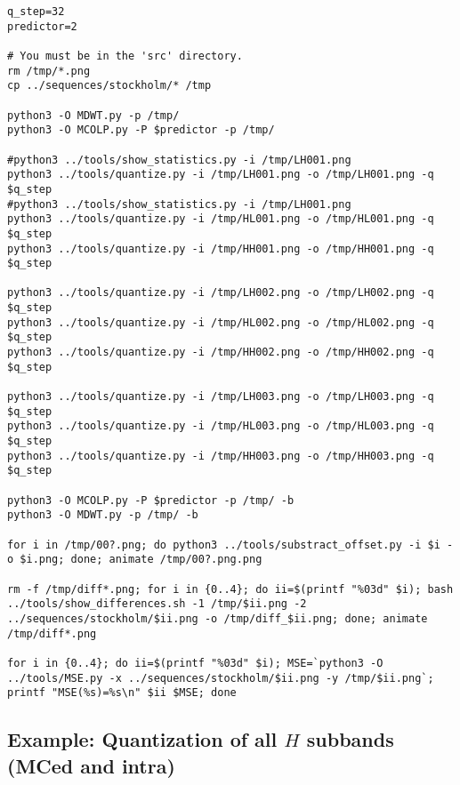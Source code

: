 \begin{verbatim}
q_step=32
predictor=2

# You must be in the 'src' directory.
rm /tmp/*.png
cp ../sequences/stockholm/* /tmp

python3 -O MDWT.py -p /tmp/
python3 -O MCOLP.py -P $predictor -p /tmp/

#python3 ../tools/show_statistics.py -i /tmp/LH001.png
python3 ../tools/quantize.py -i /tmp/LH001.png -o /tmp/LH001.png -q $q_step
#python3 ../tools/show_statistics.py -i /tmp/LH001.png
python3 ../tools/quantize.py -i /tmp/HL001.png -o /tmp/HL001.png -q $q_step
python3 ../tools/quantize.py -i /tmp/HH001.png -o /tmp/HH001.png -q $q_step

python3 ../tools/quantize.py -i /tmp/LH002.png -o /tmp/LH002.png -q $q_step
python3 ../tools/quantize.py -i /tmp/HL002.png -o /tmp/HL002.png -q $q_step
python3 ../tools/quantize.py -i /tmp/HH002.png -o /tmp/HH002.png -q $q_step

python3 ../tools/quantize.py -i /tmp/LH003.png -o /tmp/LH003.png -q $q_step
python3 ../tools/quantize.py -i /tmp/HL003.png -o /tmp/HL003.png -q $q_step
python3 ../tools/quantize.py -i /tmp/HH003.png -o /tmp/HH003.png -q $q_step

python3 -O MCOLP.py -P $predictor -p /tmp/ -b
python3 -O MDWT.py -p /tmp/ -b

for i in /tmp/00?.png; do python3 ../tools/substract_offset.py -i $i -o $i.png; done; animate /tmp/00?.png.png

rm -f /tmp/diff*.png; for i in {0..4}; do ii=$(printf "%03d" $i); bash ../tools/show_differences.sh -1 /tmp/$ii.png -2 ../sequences/stockholm/$ii.png -o /tmp/diff_$ii.png; done; animate /tmp/diff*.png

for i in {0..4}; do ii=$(printf "%03d" $i); MSE=`python3 -O ../tools/MSE.py -x ../sequences/stockholm/$ii.png -y /tmp/$ii.png`; printf "MSE(%s)=%s\n" $ii $MSE; done
\end{verbatim}


\subsection*{Example: Quantization of all $H$ subbands (MCed and intra)}

